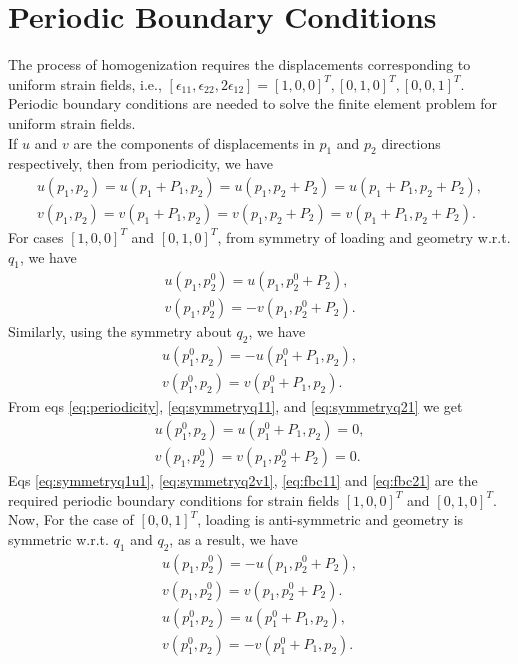 \documentclass[openright,twoside]{iitkthesis}
\begin{document}
\section{Periodic Boundary Conditions}
The process of homogenization requires the displacements corresponding to uniform strain fields, i.e., $[\epsilon_{11}, \epsilon_{22}, 2\epsilon_{12}] = [1, 0, 0]^T, [0, 1, 0]^T, [0, 0, 1]^T$. Periodic boundary conditions are needed to solve the finite element problem for uniform strain fields.\\
If $u$ and $v$ are the components of displacements in $p_1$ and $p_2$ directions respectively, then from periodicity, we have
\begin{equation}
\label{eq:periodicity}
\begin{split}
u(p_1, p_2) = u(p_1+P_1, p_2) = u(p_1, p_2+P_2) = u(p_1+P_1, p_2+P_2),\\
v(p_1, p_2) = v(p_1+P_1, p_2) = v(p_1, p_2+P_2) = v(p_1+P_1, p_2+P_2).
\end{split}
\end{equation}
For cases $[1, 0, 0]^T$ and $[0, 1, 0]^T$, from symmetry of loading and geometry w.r.t. $q_1$, we have
\begin{eqnarray}
\label{eq:symmetryq1u1}
u(p_1, p_2^0) = u(p_1, p_2^0+P_2),\\
\label{eq:symmetryq11}
v(p_1, p_2^0) = -v(p_1, p_2^0+P_2).
\end{eqnarray}
Similarly, using the symmetry about $q_2$, we have
\begin{eqnarray}
\label{eq:symmetryq21}
u(p_1^0, p_2) = -u(p_1^0+P_1, p_2),\\
\label{eq:symmetryq2v1}
v(p_1^0, p_2) = v(p_1^0+P_1, p_2).
\end{eqnarray}
From eqs \eqref{eq:periodicity}, \eqref{eq:symmetryq11}, and \eqref{eq:symmetryq21}  we get
\begin{eqnarray}
\label{eq:fbc11}
u(p_1^0, p_2) = u(p_1^0+P_1, p_2) = 0,\\
\label{eq:fbc21}
v(p_1, p_2^0) = v(p_1, p_2^0+P_2) = 0.
\end{eqnarray}
Eqs \eqref{eq:symmetryq1u1}, \eqref{eq:symmetryq2v1}, \eqref{eq:fbc11} and 
\eqref{eq:fbc21} are the required periodic boundary conditions for strain fields $[1, 0, 0]^T$ and $[0, 1, 0]^T$.
\\
Now, For the case of $[0, 0, 1]^T$, loading is anti-symmetric and geometry is symmetric w.r.t. $q_1$ and $q_2$, as a result, we have
\begin{eqnarray}
\label{eq:symmetryq1u}
u(p_1, p_2^0) = -u(p_1, p_2^0+P_2),\\
\label{eq:symmetryq1}
v(p_1, p_2^0) = v(p_1, p_2^0+P_2).\\
\label{eq:symmetryq2}
u(p_1^0, p_2) = u(p_1^0+P_1, p_2),\\
\label{eq:symmetryq2v}
v(p_1^0, p_2) = -v(p_1^0+P_1, p_2).
\end{eqnarray}
\end{document}
